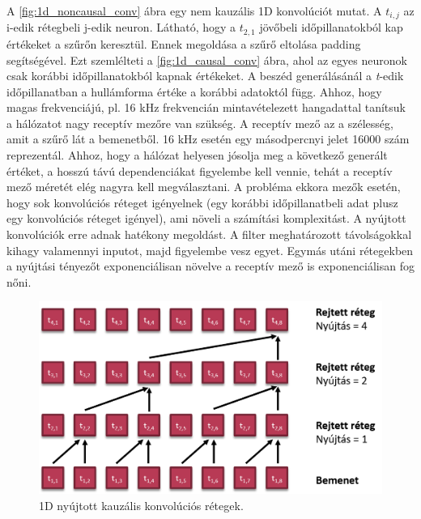 A \ref{fig:1d_noncausal_conv} ábra egy nem kauzális 1D konvolúciót mutat. A $t_{i, j}$ az i-edik rétegbeli j-edik neuron. Látható, hogy a $t_{2,1}$ jövőbeli időpillanatokból kap értékeket a szűrőn keresztül. Ennek megoldása a szűrő eltolása padding segítségével. Ezt szemlélteti a \ref{fig:1d_causal_conv} ábra, ahol az egyes neuronok csak korábbi időpillanatokból kapnak értékeket. 
\newline
\newline
A beszéd generálásánál a \emph{t}-edik időpillanatban a hullámforma értéke a korábbi adatoktól függ. Ahhoz, hogy magas frekvenciájú, pl. 16 kHz frekvencián mintavételezett 
hangadattal tanítsuk a hálózatot nagy receptív mezőre van szükség. A receptív mező az a szélesség, amit a szűrő lát a bemenetből. 16 kHz esetén egy másodpercnyi jelet 16000 szám reprezentál. Ahhoz, hogy a hálózat helyesen jósolja meg a következő generált értéket, a hosszú távú dependenciákat figyelembe kell vennie, tehát a receptív mező méretét elég nagyra kell megválasztani. A probléma ekkora mezők esetén, hogy sok konvolúciós réteget igényelnek (egy korábbi időpillanatbeli adat plusz egy konvolúciós réteget igényel), ami növeli a számítási komplexitást.
\newline
\newline
A nyújtott konvolúciók erre adnak hatékony megoldást. A filter meghatározott távolságokkal kihagy valamennyi inputot, majd figyelembe vesz egyet. Egymás utáni rétegekben a nyújtási tényezőt exponenciálisan növelve a receptív mező is exponenciálisan fog nőni.

\begin{figure}[!ht]
	\centering
	\includegraphics[width=150mm, keepaspectratio]{figures/1d-dilated-conv.png}
	\caption{1D nyújtott kauzális konvolúciós rétegek.}
	\label{fig:1d_dilated_conv}
\end{figure}

